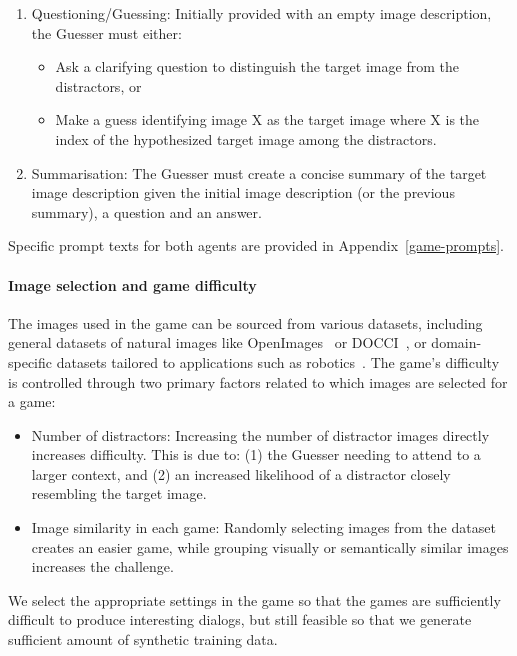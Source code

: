 \begin{enumerate}
    \item Questioning/Guessing: Initially provided with an empty image description, the Guesser must either:
    \begin{itemize}
        \item Ask a clarifying question to distinguish the target image from the distractors, or
        \item Make a guess identifying image X as the target image where X is the index of the hypothesized target image among the distractors.
    \end{itemize}
    \item Summarisation: The Guesser must create a concise summary of the target image description given the initial image description (or the previous summary), a question and an answer.
\end{enumerate}
Specific prompt texts for both agents are provided in Appendix~\ref{game-prompts}.

\paragraph{Image selection and game difficulty}
The images used in the game can be sourced from various datasets, including general datasets of natural images like OpenImages~\citep{kuznetsova2020openimages} or DOCCI~\citep{OnoeDocci2024}, or domain-specific datasets tailored to applications such as robotics~\citep{zhao2023learning}.
The game's difficulty is controlled through two primary factors related to which images are selected for a game:
\begin{itemize}
    \item Number of distractors: Increasing the number of distractor images directly increases difficulty. This is due to: (1) the Guesser needing to attend to a larger context, and (2) an increased likelihood of a distractor closely resembling the target image.
    \item Image similarity in each game: Randomly selecting images from the dataset creates an easier game, while grouping visually or semantically similar images increases the challenge.
\end{itemize}

We select the appropriate settings in the game so that the games are sufficiently difficult to produce interesting dialogs, but still feasible so that we generate sufficient amount of synthetic training data.

